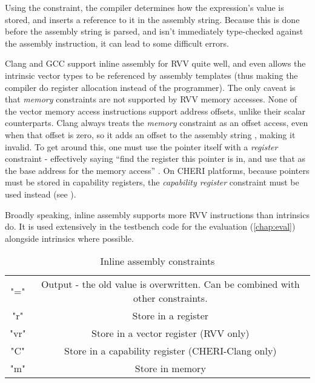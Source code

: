 \documentclass[../thesis]{subfiles}
\begin{document}
Using the constraint, the compiler determines how the expression's value is stored, and inserts a reference to it in the assembly string.
Because this is done before the assembly string is parsed, and isn't immediately type-checked against the assembly instruction, it can lead to some difficult errors.

Clang and GCC support inline assembly for RVV quite well, and even allows the intrinsic vector types to be referenced by assembly templates (thus making the compiler do register allocation instead of the programmer).
The only caveat is that \emph{memory} constraints are not supported by RVV memory accesses.
None of the vector memory access instructions support address offsets, unlike their scalar counterparts.
Clang always treats the \emph{memory} constraint as an offset access, even when that offset is zero, so it adds an offset to the assembly string , making it invalid.
To get around this, one must use the pointer itself with a \emph{register} constraint - effectively saying \enquote{find the register this pointer is in, and use that as the base address for the memory access} .
On CHERI platforms, because pointers must be stored in capability registers, the \emph{capability register} constraint must be used instead (see ).

Broadly speaking, inline assembly supports more RVV instructions than intrinsics do.
It is used extensively in the testbench code for the evaluation (\cref{chap:eval}) alongside intrinsics where possible.


\begin{table}[]
    \centering
    \begin{tabular}{c|c}
       "="  & Output - the old value is overwritten. Can be combined with other constraints. \\
        "r" & Store in a register \\
        "vr" & Store in a vector register (RVV only) \\
        "C" & Store in a capability register (CHERI-Clang only) \\
        "m" & Store in memory \\
    \end{tabular}
    \caption{Inline assembly constraints\cite[Section 6.47.2]{UsingGNUCompiler2022}}
    \label{tab:inline_asm_constraints}
\end{table}
\end{document}
